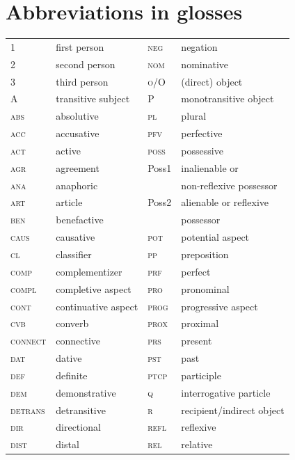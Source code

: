 \documentclass[output=collectionpaper]{langsci/langscibook}
\begin{document}
\section*{Abbreviations in glosses}
\begin{tabularx}{\textwidth}{@{}lXlQ@{}}
  1	&	first person	&	\textsc{neg}	&	negation	\\
  2	&	second person	&	\textsc{nom}	&	nominative	\\
  3	&	third person	&	\textsc{o}/O	&	(direct) object	\\
  A 	&	transitive subject	&	P 	&	monotransitive object	\\
  \textsc{abs}	&	absolutive	&	\textsc{pl}	&	plural	\\
  \textsc{acc}	&	accusative	&	\textsc{pfv}	&	perfective	\\
  \textsc{act}	&	active	&	\textsc{poss}	&	possessive	\\
  \textsc{agr}	&	agreement	&	Poss1 	&	inalienable or  	\\
  \textsc{ana}	&	anaphoric	&		&	non-reflexive possessor	\\
  \textsc{art}	&	article	&	Poss2	&	alienable or reflexive 	\\
  \textsc{ben}	&	benefactive	&		&	possessor	\\
  \textsc{caus}	&	causative	&	\textsc{pot}	&	potential aspect	\\
  \textsc{cl}	&	classifier	&	\textsc{pp}	&	preposition	\\
  \textsc{comp}	&	complementizer	&	\textsc{prf}	&	perfect	\\
  \textsc{compl}	&	completive aspect	&	\textsc{pro}	&	pronominal	\\
  \textsc{cont}	&	continuative aspect	&	\textsc{prog}	&	progressive aspect	\\
  \textsc{cvb}	&	converb	&	\textsc{prox}	&	proximal	\\
  \textsc{connect}	&	connective	&	\textsc{prs}	&	present	\\
  \textsc{dat}	&	dative	&	\textsc{pst}	&	past	\\
  \textsc{def}	&	definite	&	\textsc{ptcp}	&	participle	\\
  \textsc{dem}	&	demonstrative	&	\textsc{q}	&	interrogative particle	\\
  \textsc{detrans}	&	detransitive	&	\textsc{r}	&	recipient/indirect object	\\
  \textsc{dir}	&	directional	&	\textsc{refl}	&	reflexive	\\
  \textsc{dist}	&	distal	&	\textsc{rel}	&	relative	\\

\end{tabularx}
\end{document}
